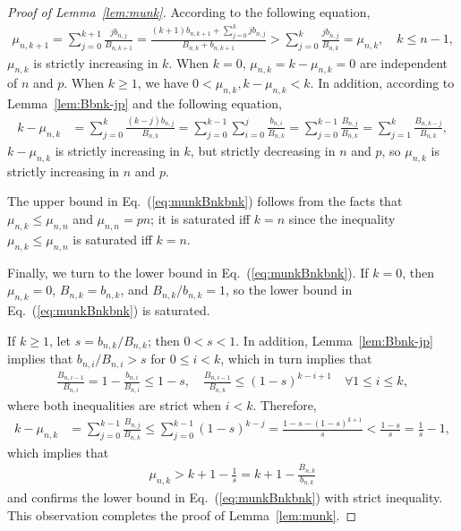 \documentclass[aop]{imsart}
\theoremstyle{plain}
\theoremstyle{remark}
\newcommand{\1}{\operatorname{\uppercase\expandafter{\romannumeral1}}}
\newcommand{\2}{\operatorname{\uppercase\expandafter{\romannumeral2}}}
\newcommand{\3}{\operatorname{\uppercase\expandafter{\romannumeral3}}}
\newcommand{\4}{\operatorname{\uppercase\expandafter{\romannumeral4}}}
\newcommand{\5}{\operatorname{\uppercase\expandafter{\romannumeral5}}}
\newcommand{\6}{\operatorname{\uppercase\expandafter{\romannumeral6}}}
\newcommand{\7}{\operatorname{\uppercase\expandafter{\romannumeral7}}}
\newcommand{\8}{\operatorname{\uppercase\expandafter{\romannumeral8}}}
\newcommand{\9}{\operatorname{\uppercase\expandafter{\romannumeral9}}}
\newcommand{\eref}[1]{Eq.~\textup{(\ref{#1})}}
\newcommand{\lref}[1]{Lemma~\ref{#1}}
\begin{document}
\begin{proof}[Proof of \lref{lem:munk}]
	According to the following equation,
	\begin{align}
	\mu_{n,k+1}=\sum_{j=0}^{k+1} \frac{j b_{n,j}}{B_{n,k+1}}
	=\frac{(k+1)b_{n,k+1}+\sum_{j=0}^kj b_{n,j}}{B_{n,k}+b_{n,k+1}}>\sum_{j=0}^k \frac{j b_{n,j}}{B_{n,k}}=\mu_{n,k},\quad k\leq n-1,
	\end{align}
	$\mu_{n,k}$ is strictly increasing in $k$. 
	When $k=0$, $\mu_{n,k}=k-\mu_{n,k}=0$ are independent of $n$ and $p$. When $k\geq1$, we have $0<\mu_{n,k}, k-\mu_{n,k}<k$. In addition,
	according to \lref{lem:Bbnk-jp} and 
	the following equation,
	\begin{align}
	k-\mu_{n,k}
	&=\sum_{j=0}^k \frac{(k-j) b_{n,j}}{B_{n,k}}
	=\sum_{j=0}^{k-1}\sum_{i=0}^j \frac{b_{n,i}}{B_{n,k}}
	=\sum_{j=0}^{k-1} \frac{B_{n,j}}{B_{n,k}}=\sum_{j=1}^{k} \frac{B_{n,k-j}}{B_{n,k}},
	\end{align}
	$k-\mu_{n,k}$ is strictly increasing in $k$, but strictly decreasing in $n$ and $p$, so $\mu_{n,k}$  is strictly increasing in $n$ and $p$.
	
	
	The upper bound in \eref{eq:munkBnkbnk} follows from the facts that $\mu_{n,k}\leq \mu_{n,n}$ and $\mu_{n,n}= pn$; it is saturated iff $k=n$ since the inequality  $\mu_{n,k}\leq \mu_{n,n}$ is saturated iff $k=n$.
	
Finally, we turn to the lower bound in \eref{eq:munkBnkbnk}. If $k=0$, then $\mu_{n,k}=0$, $B_{n,k}=b_{n,k}$, and $B_{n,k}/b_{n,k}=1$, so the lower bound in \eref{eq:munkBnkbnk} is saturated. 
	
	If $k\geq 1$,  let $s=b_{n,k}/B_{n,k}$;  then $0<s<1$. In addition,
	\lref{lem:Bbnk-jp} implies that  $b_{n,i}/B_{n,i}> s$ for $0\leq i< k$, which in turn implies that
	\begin{gather}
	\frac{B_{n,i-1}}{B_{n,i}}=1-\frac{b_{n,i}}{B_{n,i}}\leq 1-s,\quad  \frac{B_{n,i-1}}{B_{n,k}}\leq (1-s)^{k-i+1}
	\quad \forall 1\leq i\leq k,
	\end{gather}
	where both inequalities are strict when $i<k$.
	Therefore,
	\begin{align}
	k-\mu_{n,k}
	&=\sum_{j=0}^{k-1} \frac{B_{n,j}}{B_{n,k}}\leq \sum_{j=0}^{k-1} (1-s)^{k-j}
	=\frac{1-s-(1-s)^{k+1}}{s}< \frac{1-s}{s}=\frac{1}{s} -1,
	\end{align}
	which implies that 
	\begin{align}
	\mu_{n,k}>  k+1-\frac{1}{s}= k+1-\frac{B_{n,k}}{b_{n,k}}
	\end{align} 
and confirms the lower bound in \eref{eq:munkBnkbnk} with strict inequality. 	
This observation  completes the proof of \lref{lem:munk}. 
\end{proof}
\end{document}

